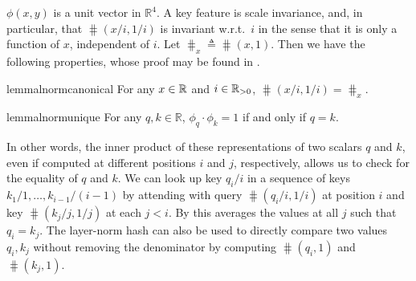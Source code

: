 \documentclass{article} %
\newcommand\change[1]{{\color{blue} #1}}
\renewcommand\change[1]{#1}
\begin{document}
$\phi(x, y)$ is a unit vector in $\mathbb R^4$. A key feature is scale invariance, and, in particular, that $\hash(x/i, 1/i)$ is invariant w.r.t.\ $i$ in the sense that it is only a function of $x$, independent of $i$.
Let $\hash_x \triangleq \hash(x, 1)$. Then we have the following properties, \change{whose proof may be found in .}
\begin{restatable}{lemma}{lnormcanonical}
    \label{lem:lnorm-canonical}
    For any $x \in \mathbb{R}$ and $i \in \mathbb{R}_{>0}$,
    $\hash(x/i, 1/i) = \hash_x$.
\end{restatable}
\begin{restatable}{lemma}{lnormunique} 
    \label{lem:lnorm-unique}
    For any $q, k \in \mathbb R$, $\phi_q \cdot \phi_k = 1$ if and only if $q = k$.
\end{restatable}
\change{In other words, the inner product of these representations of two scalars $q$ and $k$, even if computed at different positions $i$ and $j$, respectively, allows us to check for the equality of $q$ and $k$.}
%
%
We can look up key $q_i/i$ in a sequence of keys $k_1/1, \ldots, k_{i-1}/(i-1)$ by attending with query $\hash(q_i/i, 1/i)$ at position $i$ and key $\hash(k_j/j, 1/j)$ at each $j < i$.
By  this averages the values at all $j$ such that $q_i = k_j$.
The layer-norm hash can also be used to directly compare two values $q_i, k_j$ without removing the denominator by computing $\hash(q_i, 1)$ and $\hash(k_j, 1)$.
\end{document}
